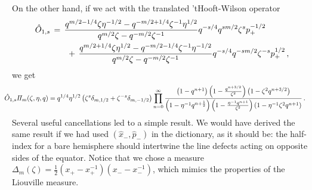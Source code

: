\documentclass[11pt,letterpaper]{article}
\numberwithin{equation}{section}
\begin{document}
On the other hand, if we act with the translated 'tHooft-Wilson operator
\begin{align}
\hat O_{1,s} &\,=\, \frac{q^{m/2-1/4} \zeta \eta^{-1/2} - q^{-m/2+1/4} \zeta^{-1} \eta^{1/2}}{q^{m/2} \zeta - q^{-m/2} \zeta^{-1}}q^{- s/4} q^{s m/2} \zeta^s p_+^{-1/2} \notag \\ &\qquad+\, \frac{q^{m/2+1/4} \zeta \eta^{1/2} - q^{-m/2-1/4} \zeta^{-1} \eta^{-1/2}}{q^{m/2} \zeta - q^{-m/2} \zeta^{-1}}q^{- s/4} q^{-s m/2} \zeta^{-s} p_+^{1/2}\,,
\end{align}
we get
\begin{align}
& \hspace{-.4cm}\hat O_{1,s}  I\!I_m(\zeta,\eta,q) = q^{1/4} \eta^{1/2} \left( \zeta^s \delta_{m,1/2} + \zeta^{-s} \delta_{m,-1/2}  \right) \prod_{n=0}^{\infty} \frac{\left(1-q^{n+1}\right)\left(1-\frac{q^{n+3/2}}{\zeta^2}\right) \left(1-\zeta^2 q^{n+3/2}\right)}{ \left(1-\eta^{-1} q^{n+\frac{1}{2}}\right)
   \left(1-\frac{\eta^{-1} q^{n+1}}{\zeta^2}\right) \left(1-\eta^{-1} \zeta^2 q^{n+1}\right)}\,.
\end{align}
Several useful cancellations led to a simple result. We would have derived the same result if we had used $(\hat x_-,\hat p_-)$ in the dictionary,
as it should be: the half-index for a bare hemisphere should intertwine the line defects acting on opposite sides of the equator.
Notice that we chose a measure $\Delta_m(\zeta) = \frac{1}{2} (x_+ - x_+^{-1})(x_- - x_-^{-1})$, which mimics
the properties of the Liouville measure.
\end{document}
